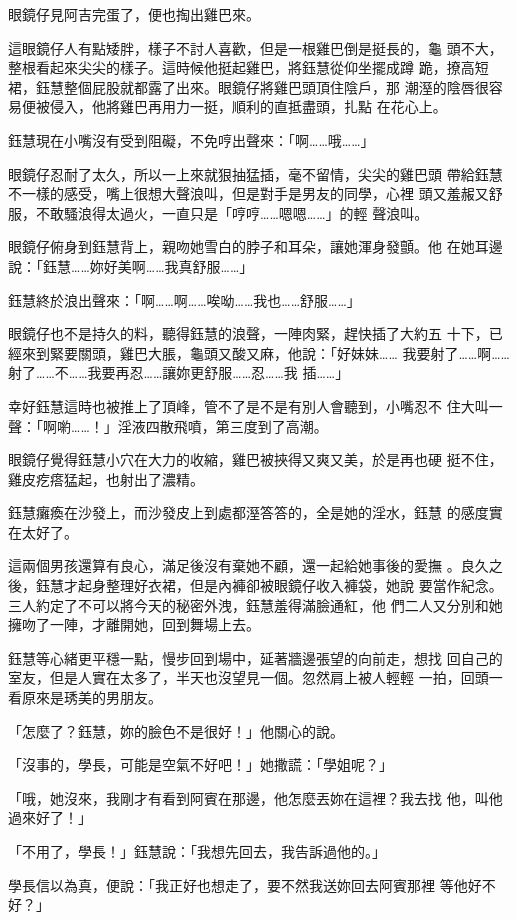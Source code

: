 眼鏡仔見阿吉完蛋了，便也掏出雞巴來。

這眼鏡仔人有點矮胖，樣子不討人喜歡，但是一根雞巴倒是挺長的，龜
頭不大，整根看起來尖尖的樣子。這時候他挺起雞巴，將鈺慧從仰坐擺成蹲
跪，撩高短裙，鈺慧整個屁股就都露了出來。眼鏡仔將雞巴頭頂住陰戶，那
潮溼的陰唇很容易便被侵入，他將雞巴再用力一挺，順利的直抵盡頭，扎點
在花心上。

鈺慧現在小嘴沒有受到阻礙，不免哼出聲來：「啊……哦……」

眼鏡仔忍耐了太久，所以一上來就狠抽猛插，毫不留情，尖尖的雞巴頭
帶給鈺慧不一樣的感受，嘴上很想大聲浪叫，但是對手是男友的同學，心裡
頭又羞赧又舒服，不敢騷浪得太過火，一直只是「哼哼……嗯嗯……」的輕
聲浪叫。

眼鏡仔俯身到鈺慧背上，親吻她雪白的脖子和耳朵，讓她渾身發顫。他
在她耳邊說：「鈺慧……妳好美啊……我真舒服……」

鈺慧終於浪出聲來：「啊……啊……唉呦……我也……舒服……」

眼鏡仔也不是持久的料，聽得鈺慧的浪聲，一陣肉緊，趕快插了大約五
十下，已經來到緊要關頭，雞巴大脹，龜頭又酸又麻，他說：「好妹妹……
我要射了……啊……射了……不……我要再忍……讓妳更舒服……忍……我
插……」

幸好鈺慧這時也被推上了頂峰，管不了是不是有別人會聽到，小嘴忍不
住大叫一聲：「啊喲……！」淫液四散飛噴，第三度到了高潮。

眼鏡仔覺得鈺慧小穴在大力的收縮，雞巴被挾得又爽又美，於是再也硬
挺不住，雞皮疙瘩猛起，也射出了濃精。

鈺慧癱瘓在沙發上，而沙發皮上到處都溼答答的，全是她的淫水，鈺慧
的感度實在太好了。

這兩個男孩還算有良心，滿足後沒有棄她不顧，還一起給她事後的愛撫
。良久之後，鈺慧才起身整理好衣裙，但是內褲卻被眼鏡仔收入褲袋，她說
要當作紀念。三人約定了不可以將今天的秘密外洩，鈺慧羞得滿臉通紅，他
們二人又分別和她擁吻了一陣，才離開她，回到舞場上去。

鈺慧等心緒更平穩一點，慢步回到場中，延著牆邊張望的向前走，想找
回自己的室友，但是人實在太多了，半天也沒望見一個。忽然肩上被人輕輕
一拍，回頭一看原來是琇美的男朋友。

「怎麼了？鈺慧，妳的臉色不是很好！」他關心的說。

「沒事的，學長，可能是空氣不好吧！」她撒謊：「學姐呢？」

「哦，她沒來，我剛才有看到阿賓在那邊，他怎麼丟妳在這裡？我去找
他，叫他過來好了！」

「不用了，學長！」鈺慧說：「我想先回去，我告訴過他的。」

學長信以為真，便說：「我正好也想走了，要不然我送妳回去阿賓那裡
等他好不好？」


